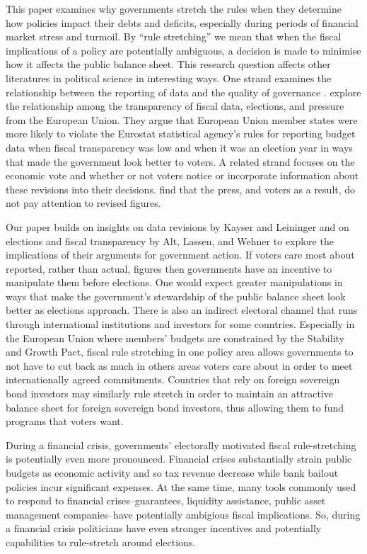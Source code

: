 \documentclass[]{article}
\begin{document}
This paper examines why governments stretch the rules when they determine how policies impact their debts and deficits, especially during periods of financial market stress and turmoil. By ``rule stretching'' we mean that when the fiscal implications of a policy are potentially ambiguous, a decision is made to minimise how it affects the public balance sheet. This research question affects other literatures in political science in interesting ways. One strand examines the relationship between the reporting of data and the quality of governance \cite[e.g.][]{Hollyer2014}. \cite{Alt2014} explore the relationship among the transparency of fiscal data, elections, and pressure from the European Union. They argue that European Union member states were more likely to violate the Eurostat statistical agency's rules for reporting budget data when fiscal transparency was low and when it was an election year in ways that made the government look better to voters. A related strand focuses on the economic vote and whether or not voters notice or incorporate information about these revisions into their decisions. \cite{KayserLeininger2015} find that the press, and voters as a result, do not pay attention to revised figures.

Our paper builds on insights on data revisions by Kayser and Leininger and on elections and fiscal transparency by Alt, Lassen, and Wehner to explore the implications of their arguments for government action. If voters care most about reported, rather than actual, figures then governments have an incentive to manipulate them before elections. One would expect greater manipulations in ways that make the government's stewardship of the public balance sheet look better as elections approach. There is also an indirect electoral channel that runs through international institutions and investors for some countries. Especially in the European Union where members' budgets are constrained by the Stability and Growth Pact, fiscal rule stretching in one policy area allows governments to not have to cut back as much in others areas voters care about in order to meet internationally agreed commitments. Countries that rely on foreign sovereign bond investors may similarly rule stretch in order to maintain an attractive balance sheet for foreign sovereign bond investors, thus allowing them to fund programs that voters want.

During a financial crisis, governments' electorally motivated fiscal rule-stretching is potentially even more pronounced. Financial crises substantially strain public budgets as economic activity and so tax revenue decrease while bank bailout policies incur significant expenses. At the same time, many tools commonly used to respond to financial crises--guarantees, liquidity assistance, public asset management companies--have potentially ambigious fiscal implications. So, during a financial crisis politicians have even stronger incentives and potentially capabilities to rule-stretch around elections.
\end{document}
